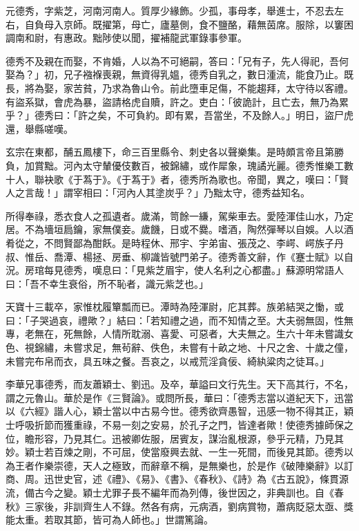 
\begin{pinyinscope}

 元德秀，字紫芝，河南河南人。質厚少緣飾。少孤，事母孝，舉進士，不忍去左右，自負母入京師。既擢第，母亡，廬墓側，食不鹽酪，藉無茵席。服除，以窶困調南和尉，有惠政。黜陟使以聞，擢補龍武軍錄事參軍。



 德秀不及親在而娶，不肯婚，人以為不可絕嗣，答曰：「兄有子，先人得祀，吾何娶為？」初，兄子襁褓喪親，無資得乳媼，德秀自乳之，數日湩流，能食乃止。既長，將為娶，家苦貧，乃求為魯山令。前此墮車足傷，不能趨拜，太守待以客禮。有盜系獄，會虎為暴，盜請格虎自贖，許之。吏白：「彼詭計，且亡去，無乃為累乎？」德秀曰：「許之矣，不可負約。即有累，吾當坐，不及餘人。」明日，盜尸虎還，舉縣嗟嘆。



 玄宗在東都，酺五鳳樓下，命三百里縣令、刺史各以聲樂集。是時頗言帝且第勝負，加賞黜。河內太守輦優伎數百，被錦繡，或作犀象，瑰譎光麗。德秀惟樂工數十人，聯袂歌《于蒍于》。《于蒍于》者，德秀所為歌也。帝聞，異之，嘆曰：「賢人之言哉！」謂宰相曰：「河內人其塗炭乎？」乃黜太守，德秀益知名。



 所得奉祿，悉衣食人之孤遺者。歲滿，笥餘一縑，駕柴車去。愛陸渾佳山水，乃定居。不為墻垣扃鑰，家無僕妾。歲饑，日或不爨。嗜酒，陶然彈琴以自娛。人以酒肴從之，不問賢鄙為酣飫。是時程休、邢宇、宇弟宙、張茂之、李崿、崿族子丹叔、惟岳、喬潭、楊拯、房垂、柳識皆號門弟子。德秀善文辭，作《蹇士賦》以自況。房琯每見德秀，嘆息曰：「見紫芝眉宇，使人名利之心都盡。」蘇源明常語人曰：「吾不幸生衰俗，所不恥者，識元紫芝也。」



 天寶十三載卒，家惟枕履簞瓢而已。潭時為陸渾尉，庀其葬。族弟結哭之慟，或曰：「子哭過哀，禮歟？」結曰：「若知禮之過，而不知情之至。大夫弱無固，性無專，老無在，死無餘，人情所耽溺、喜愛、可惡者，大夫無之。生六十年未嘗識女色、視錦繡，未嘗求足，無茍辭、佚色，未嘗有十畝之地、十尺之舍、十歲之僮，未嘗完布帛而衣，具五味之餐。吾哀之，以戒荒淫貪佞、綺紈粱肉之徒耳。」



 李華兄事德秀，而友蕭穎士、劉迅。及卒，華謚曰文行先生。天下高其行，不名，謂之元魯山。華於是作《三賢論》。或問所長，華曰：「德秀志當以道紀天下，迅當以《六經》諧人心，穎士當以中古易今世。德秀欲齊愚智，迅感一物不得其正，穎士呼吸折節而獲重祿，不易一刻之安易，於孔子之門，皆達者歟！使德秀據師保之位，瞻形容，乃見其仁。迅被卿佐服，居賓友，謀治亂根源，參乎元精，乃見其妙。穎士若百煉之剛，不可屈，使當廢興去就、一生一死間，而後見其節。德秀以為王者作樂崇德，天人之極致，而辭章不稱，是無樂也，於是作《破陣樂辭》以訂商、周。迅世史官，述《禮》、《易》、《書》、《春秋》、《詩》為《古五說》，條貫源流，備古今之變。穎士尤罪子長不編年而為列傳，後世因之，非典訓也。自《春秋》三家後，非訓齊生人不錄。然各有病，元病酒，劉病賞物，蕭病貶惡太亟、獎能太重。若取其節，皆可為人師也。」世謂篤論。




\end{pinyinscope}
